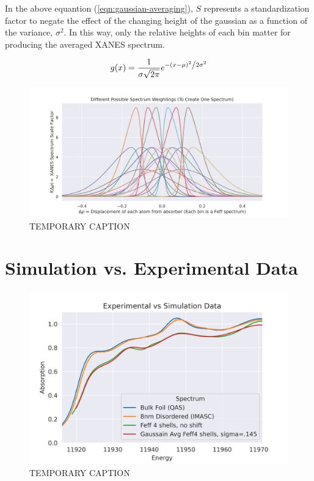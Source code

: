 In the above equantion (\ref{eqn:gaussian-averaging}), $ S $ represents a standardization factor to negate the effect of the changing height of the gaussian as a function of the variance, $ \sigma^2 $. In this way, only the relative heights of each bin matter for producing the averaged XANES spectrum.

\begin{equation}
	\label{eqn:gaussian}
	g(x) = \frac{1}{{\sigma \sqrt {2\pi } }}e^{{{ - \left( {x - \mu } \right)^2 } \mathord{\left/ {\vphantom {{ - \left( {x - \mu } \right)^2 } {2\sigma ^2 }}} \right. \kern-\nulldelimiterspace} {2\sigma ^2 }}}
\end{equation}



\begin{figure}[!htb]
	\centering
	\includegraphics[width=\linewidth]{Chapters/Figures/skewnorm_options.png}
	\caption[Simulated Disordered Spectrum Weightings]{TEMPORARY CAPTION}
	\label{fig:skew-norm-options}
\end{figure}


\section{Simulation vs. Experimental Data}

\begin{figure}[h]
	\centering
	\includegraphics[width=.7\linewidth]{Chapters/Figures/bulk_8nm_disorder_experimental_theory_comparison.png}
	\caption[Simulation vs. Experimental]{TEMPORARY CAPTION}
	\label{fig:avg-experimental-vs-simulation}
\end{figure}


